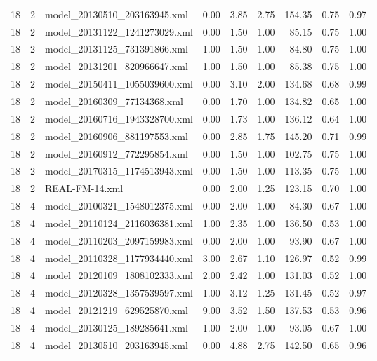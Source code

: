 \begin{table}[ht]
\begin{tabular}{rrlrrrrrr}
   18 &   2 & model\_20130510\_203163945.xml & 0.00 & 3.85 & 2.75 & 154.35 & 0.75 & 0.97 \\ 
   18 &   2 & model\_20131122\_1241273029.xml & 0.00 & 1.50 & 1.00 & 85.15 & 0.75 & 1.00 \\ 
   18 &   2 & model\_20131125\_731391866.xml & 1.00 & 1.50 & 1.00 & 84.80 & 0.75 & 1.00 \\ 
   18 &   2 & model\_20131201\_820966647.xml & 1.00 & 1.50 & 1.00 & 85.38 & 0.75 & 1.00 \\ 
   18 &   2 & model\_20150411\_1055039600.xml & 0.00 & 3.10 & 2.00 & 134.68 & 0.68 & 0.99 \\ 
   18 &   2 & model\_20160309\_77134368.xml & 0.00 & 1.70 & 1.00 & 134.82 & 0.65 & 1.00 \\ 
   18 &   2 & model\_20160716\_1943328700.xml & 0.00 & 1.73 & 1.00 & 136.12 & 0.64 & 1.00 \\ 
   18 &   2 & model\_20160906\_881197553.xml & 0.00 & 2.85 & 1.75 & 145.20 & 0.71 & 0.99 \\ 
   18 &   2 & model\_20160912\_772295854.xml & 0.00 & 1.50 & 1.00 & 102.75 & 0.75 & 1.00 \\ 
   18 &   2 & model\_20170315\_1174513943.xml & 0.00 & 1.50 & 1.00 & 113.35 & 0.75 & 1.00 \\ 
   18 &   2 & REAL-FM-14.xml & 0.00 & 2.00 & 1.25 & 123.15 & 0.70 & 1.00 \\ 
   18 &   4 & model\_20100321\_1548012375.xml & 0.00 & 2.00 & 1.00 & 84.30 & 0.67 & 1.00 \\ 
   18 &   4 & model\_20110124\_2116036381.xml & 1.00 & 2.35 & 1.00 & 136.50 & 0.53 & 1.00 \\ 
   18 &   4 & model\_20110203\_2097159983.xml & 0.00 & 2.00 & 1.00 & 93.90 & 0.67 & 1.00 \\ 
   18 &   4 & model\_20110328\_1177934440.xml & 3.00 & 2.67 & 1.10 & 126.97 & 0.52 & 0.99 \\ 
   18 &   4 & model\_20120109\_1808102333.xml & 2.00 & 2.42 & 1.00 & 131.03 & 0.52 & 1.00 \\ 
   18 &   4 & model\_20120328\_1357539597.xml & 1.00 & 3.12 & 1.25 & 131.45 & 0.52 & 0.97 \\ 
   18 &   4 & model\_20121219\_629525870.xml & 9.00 & 3.52 & 1.50 & 137.53 & 0.53 & 0.96 \\ 
   18 &   4 & model\_20130125\_189285641.xml & 1.00 & 2.00 & 1.00 & 93.05 & 0.67 & 1.00 \\ 
   18 &   4 & model\_20130510\_203163945.xml & 0.00 & 4.88 & 2.75 & 142.50 & 0.65 & 0.96 \\ 

\end{tabular}
\end{table}
